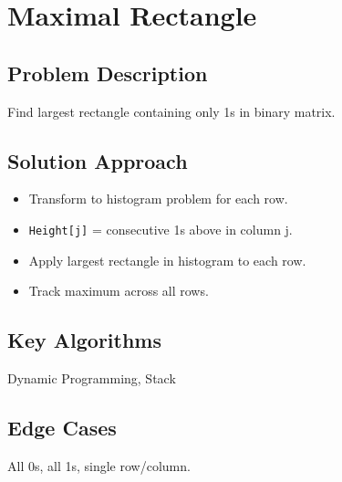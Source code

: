\documentclass[10pt, a4paper]{article}
\begin{document}
\section{Maximal Rectangle}
\subsection*{Problem Description}
Find largest rectangle containing only 1s in binary matrix.

\subsection*{Solution Approach}
\begin{itemize}
    \item Transform to histogram problem for each row.
    \item \texttt{Height[j]} = consecutive 1s above in column j.
    \item Apply largest rectangle in histogram to each row.
    \item Track maximum across all rows.
\end{itemize}

\subsection*{Key Algorithms}
Dynamic Programming, Stack

\subsection*{Edge Cases}
All 0s, all 1s, single row/column.
\end{document}
